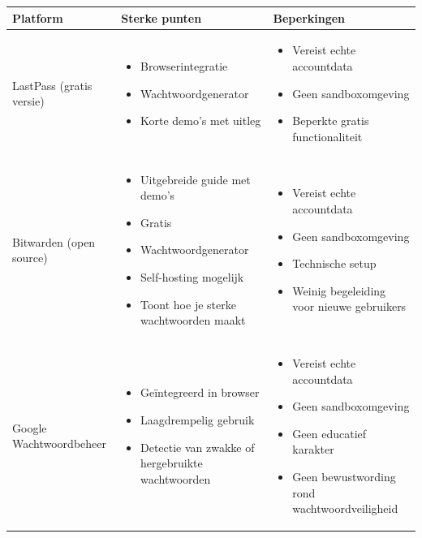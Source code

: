 

\begin{table}[H]
\footnotesize
\centering
\renewcommand{\arraystretch}{1.2}

\begin{tabularx}{\textwidth}{l X X}
\toprule
\textbf{Platform} & \textbf{Sterke punten} & \textbf{Beperkingen} \\
\midrule

LastPass (gratis versie) &
\begin{itemize}[leftmargin=*, nosep]
\item Browserintegratie
\item Wachtwoordgenerator
\item Korte demo’s met uitleg
\end{itemize}
&
\begin{itemize}[leftmargin=*, nosep]
\item Vereist echte accountdata
\item Geen sandboxomgeving
\item Beperkte gratis functionaliteit
\end{itemize}
\\

Bitwarden (open source) &
\begin{itemize}[leftmargin=*, nosep]
\item Uitgebreide guide met demo’s
\item Gratis
\item Wachtwoordgenerator
\item Self-hosting mogelijk
\item Toont hoe je sterke wachtwoorden maakt
\end{itemize}
&
\begin{itemize}[leftmargin=*, nosep]
\item Vereist echte accountdata
\item Geen sandboxomgeving
\item Technische setup
\item Weinig begeleiding voor nieuwe gebruikers
\end{itemize}
\\

Google Wachtwoordbeheer &
\begin{itemize}[leftmargin=*, nosep]
\item Geïntegreerd in browser
\item Laagdrempelig gebruik
\item Detectie van zwakke of hergebruikte wachtwoorden
\end{itemize}
&
\begin{itemize}[leftmargin=*, nosep]
\item Vereist echte accountdata
\item Geen sandboxomgeving
\item Geen educatief karakter
\item Geen bewustwording rond wachtwoordveiligheid
\end{itemize}
\\


\end{tabularx}
\end{table}
